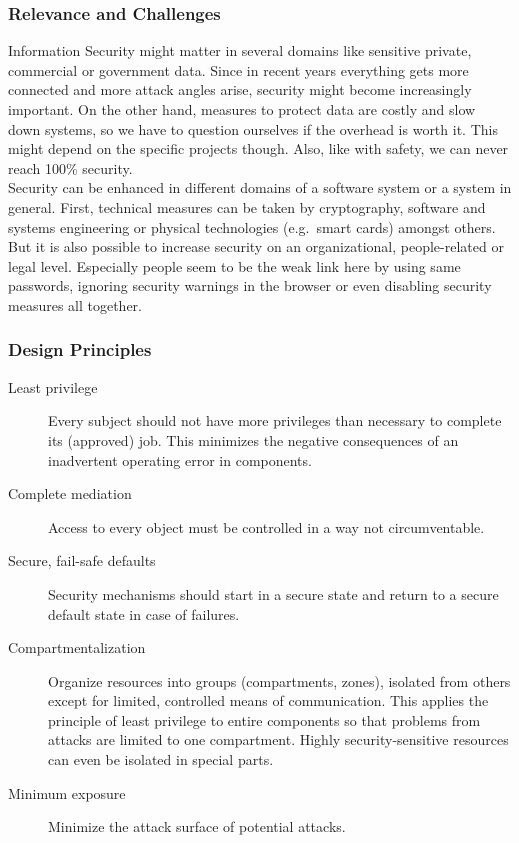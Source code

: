 \subsubsection{Relevance and Challenges}
Information Security might matter in several domains like sensitive private, commercial or government data.
Since in recent years everything gets more connected and more attack angles arise, security might become increasingly important.
On the other hand, measures to protect data are costly and slow down systems, so we have to question ourselves if the overhead is worth it.
This might depend on the specific projects though.
Also, like with safety, we can never reach 100\% security.\\
Security can be enhanced in different domains of a software system or a system in general.
First, technical measures can be taken by cryptography, software and systems engineering or physical technologies (e.g.\ smart cards) amongst others.
But it is also possible to increase security on an organizational, people-related or legal level.
Especially people seem to be the weak link here by using same passwords, ignoring security warnings in the browser or even disabling security measures all together.

\subsubsection{Design Principles}
\begin{description}
  \item[Least privilege] Every subject should not have more privileges than necessary to complete its (approved) job.
    This minimizes the negative consequences of an inadvertent operating error in components.
  \item[Complete mediation] Access to every object must be controlled in a way not circumventable.
  \item[Secure, fail-safe defaults] Security mechanisms should start in a secure state and return to a secure default state in case of failures.
  \item[Compartmentalization] Organize resources into groups (compartments, zones), isolated from others except for limited, controlled means of communication.
    This applies the principle of least privilege to entire components so that problems from attacks are limited to one compartment. Highly security-sensitive resources can even be isolated in special parts.
  \item[Minimum exposure] Minimize the attack surface of potential attacks.
\end{description}

